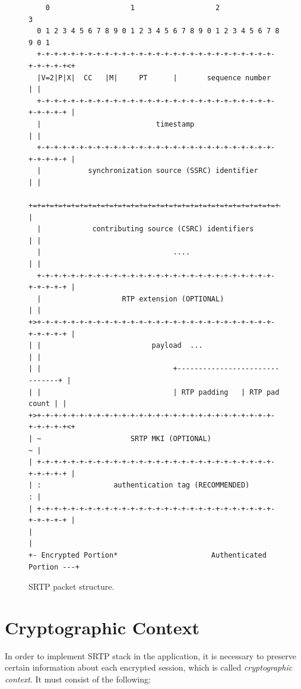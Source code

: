 \begin{figure}[H]
\centering
\begin{verbatim}
    0                   1                   2                   3
  0 1 2 3 4 5 6 7 8 9 0 1 2 3 4 5 6 7 8 9 0 1 2 3 4 5 6 7 8 9 0 1
  +-+-+-+-+-+-+-+-+-+-+-+-+-+-+-+-+-+-+-+-+-+-+-+-+-+-+-+-+-+-+-+-+<+
  |V=2|P|X|  CC   |M|     PT      |       sequence number         | |
  +-+-+-+-+-+-+-+-+-+-+-+-+-+-+-+-+-+-+-+-+-+-+-+-+-+-+-+-+-+-+-+-+ |
  |                           timestamp                           | |
  +-+-+-+-+-+-+-+-+-+-+-+-+-+-+-+-+-+-+-+-+-+-+-+-+-+-+-+-+-+-+-+-+ |
  |           synchronization source (SSRC) identifier            | |
  +=+=+=+=+=+=+=+=+=+=+=+=+=+=+=+=+=+=+=+=+=+=+=+=+=+=+=+=+=+=+=+=+ |
  |            contributing source (CSRC) identifiers             | |
  |                               ....                            | |
  +-+-+-+-+-+-+-+-+-+-+-+-+-+-+-+-+-+-+-+-+-+-+-+-+-+-+-+-+-+-+-+-+ |
  |                   RTP extension (OPTIONAL)                    | |
+>+-+-+-+-+-+-+-+-+-+-+-+-+-+-+-+-+-+-+-+-+-+-+-+-+-+-+-+-+-+-+-+-+ |
| |                          payload  ...                         | |
| |                               +-------------------------------+ |
| |                               | RTP padding   | RTP pad count | |
+>+-+-+-+-+-+-+-+-+-+-+-+-+-+-+-+-+-+-+-+-+-+-+-+-+-+-+-+-+-+-+-+-+<+
| ~                     SRTP MKI (OPTIONAL)                       ~ |
| +-+-+-+-+-+-+-+-+-+-+-+-+-+-+-+-+-+-+-+-+-+-+-+-+-+-+-+-+-+-+-+-+ |
| :                 authentication tag (RECOMMENDED)              : |
| +-+-+-+-+-+-+-+-+-+-+-+-+-+-+-+-+-+-+-+-+-+-+-+-+-+-+-+-+-+-+-+-+ |
|                                                                   |
+- Encrypted Portion*                      Authenticated Portion ---+
\end{verbatim}
\caption{SRTP packet structure.}
\end{figure}

\section{Cryptographic Context}
In order to implement SRTP stack in the application, it is necessary to
preserve certain information about each encrypted session, which is 
called \textit{cryptographic context}. It must consist of the following:

